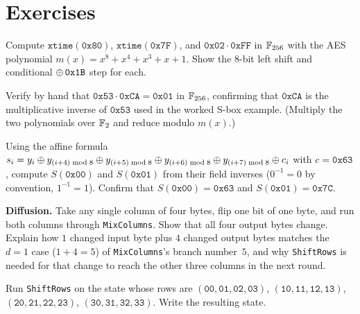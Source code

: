 \section{Exercises}

\begin{exercise}
Compute $\texttt{xtime}(\mathtt{0x80})$, $\texttt{xtime}(\mathtt{0x7F})$, and
$\mathtt{0x02}\cdot\mathtt{0xFF}$ in $\mathbb{F}_{256}$ with the AES polynomial
$m(x) = x^8+x^4+x^3+x+1$. Show the $8$-bit left shift and conditional
$\oplus\,\mathtt{0x1B}$ step for each.
\end{exercise}

\begin{exercise}
Verify by hand that $\mathtt{0x53}\cdot\mathtt{0xCA} = \mathtt{0x01}$ in
$\mathbb{F}_{256}$, confirming that $\mathtt{0xCA}$ is the multiplicative inverse of
$\mathtt{0x53}$ used in the worked S-box example. (Multiply the two polynomials
over $\mathbb{F}_2$ and reduce modulo $m(x)$.)
\end{exercise}

\begin{exercise}
Using the affine formula $s_i = y_i \oplus y_{(i+4)\bmod 8} \oplus y_{(i+5)\bmod 8} \oplus
y_{(i+6)\bmod 8} \oplus y_{(i+7)\bmod 8} \oplus c_i$ with $c=\mathtt{0x63}$, compute
$S(\mathtt{0x00})$ and $S(\mathtt{0x01})$ from their field inverses ($0^{-1}=0$ by
convention, $1^{-1}=1$). Confirm that $S(\mathtt{0x00})=\mathtt{0x63}$ and
$S(\mathtt{0x01})=\mathtt{0x7C}$.
\end{exercise}

\begin{exercise}
\textbf{Diffusion.} Take any single column of four bytes, flip one bit of one
byte, and run both columns through \texttt{MixColumns}. Show that all four output
bytes change. Explain how $1$ changed input byte plus $4$ changed output bytes
matches the $d=1$ case ($1 + 4 = 5$) of \texttt{MixColumns}'s branch number~$5$,
and why \texttt{ShiftRows} is needed for that change to reach the other three
columns in the next round.
\end{exercise}

\begin{exercise}
Run \texttt{ShiftRows} on the state whose rows are
$(\mathtt{00}, \allowbreak \mathtt{01}, \allowbreak \mathtt{02}, \allowbreak \mathtt{03})$,
$(\mathtt{10}, \allowbreak \mathtt{11}, \allowbreak \mathtt{12}, \allowbreak \mathtt{13})$,
$(\mathtt{20}, \allowbreak \mathtt{21}, \allowbreak \mathtt{22}, \allowbreak \mathtt{23})$,
$(\mathtt{30}, \allowbreak \mathtt{31}, \allowbreak \mathtt{32}, \allowbreak \mathtt{33})$. Write the resulting state.
\end{exercise}

